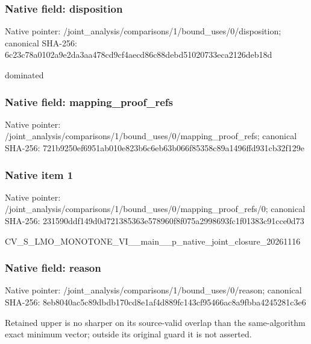 \documentclass[10pt,a4paper]{article}
\begin{document}
\subsubsection{Native field: disposition}
Native pointer: /joint\_\allowbreak{}analysis/comparisons/1/bound\_\allowbreak{}uses/0/disposition; canonical SHA-256: 6c23c78a0102a9e2da3aa478cd9cf4aecd86c88debd51020733eca2126deb18d

\begingroup\raggedright\sloppy dominated\par\endgroup

\subsubsection{Native field: mapping\_\allowbreak{}proof\_\allowbreak{}refs}
Native pointer: /joint\_\allowbreak{}analysis/comparisons/1/bound\_\allowbreak{}uses/0/mapping\_\allowbreak{}proof\_\allowbreak{}refs; canonical SHA-256: 721b9250ef6951ab010e823b6c6eb63b066f85358c89a1496ffd931cb32f129e

\subsubsection{Native item 1}
Native pointer: /joint\_\allowbreak{}analysis/comparisons/1/bound\_\allowbreak{}uses/0/mapping\_\allowbreak{}proof\_\allowbreak{}refs/0; canonical SHA-256: 231590ddf149d0d721385363e578960f8f075a2998693fc1f01383c91cce0d73

\begingroup\raggedright\sloppy CV\_\allowbreak{}S\_\allowbreak{}LMO\_\allowbreak{}MONOTONE\_\allowbreak{}VI\_\allowbreak{}\_\allowbreak{}main\_\allowbreak{}\_\allowbreak{}p\_\allowbreak{}native\_\allowbreak{}joint\_\allowbreak{}closure\_\allowbreak{}20261116\par\endgroup

\subsubsection{Native field: reason}
Native pointer: /joint\_\allowbreak{}analysis/comparisons/1/bound\_\allowbreak{}uses/0/reason; canonical SHA-256: 8eb8040ac5c89dbdb170cd8e1af4d889fc143cf95466ac8a9fbba4245281c3e6

\begingroup\raggedright\sloppy Retained upper is no sharper on its source-valid overlap than the same-algorithm exact minimum vector;\allowbreak{} outside its original guard it is not asserted.\par\endgroup
\end{document}
